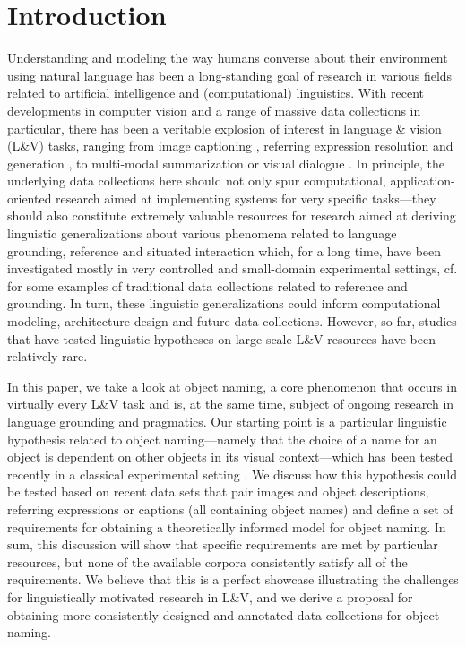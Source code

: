 \documentclass[runningheads]{llncs}
\begin{document}
\section{Introduction}

Understanding and modeling the way humans converse about their environment using natural language has been a long-standing goal of research in various fields related to artificial intelligence and (computational) linguistics.
With recent  developments in computer vision and a range of massive data collections in particular, there has been a veritable explosion of interest in language \& vision (L\&V) tasks, ranging from image captioning \cite{fangetal:2015,devlin:imcaqui,Bernardietal:automatic}, referring expression resolution and generation \cite{Kazemzadeh2014,mao15,Yu2016}, to multi-modal summarization or visual dialogue \cite{das2017visual,vries2017guesswhat}.
In principle, the underlying data collections here should not only spur computational, application-oriented research aimed at implementing systems for very specific tasks---they should also constitute extremely valuable resources for research aimed at deriving linguistic generalizations about various phenomena related to language grounding, reference and situated interaction which, for a long time, have been investigated mostly in very controlled and small-domain experimental settings, cf. \cite{anderson1991hcrc,fernangen:sigd07,krahmer:2012,takenobu2012rex,zarriess2016pentoref} for some examples of traditional data collections related to reference and grounding.  
In turn, these linguistic generalizations could inform computational modeling, architecture design and future data collections.
However, so far, studies that have tested linguistic hypotheses on large-scale L\&V resources have been relatively rare. 


In this paper, we take a look at object naming, a core phenomenon that occurs in virtually every L\&V task and is, at the same time, subject of ongoing research in language grounding and pragmatics. 
Our starting point is a particular linguistic hypothesis related to object naming---namely that the choice of a name for an object is dependent on other objects in its visual context---which has been tested recently in a classical experimental setting \cite{graf2016animal}. 
We discuss how this hypothesis could be tested based on recent data sets that pair images and object descriptions, referring expressions or captions (all containing object names) and define a set of requirements for obtaining a theoretically informed model for object naming.
In sum, this discussion will show that specific requirements are met by particular resources, but none of the available corpora consistently 
satisfy 
all of the requirements.
We believe that this is a perfect showcase illustrating the challenges for linguistically motivated research in L\&V, and we derive a proposal for obtaining more consistently designed and annotated data collections for object naming.
\end{document}
